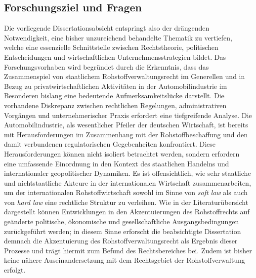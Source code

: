 \documentclass[12pt,a4paper,oneside]{book} %
\begin{document}
\subsection{Forschungsziel und Fragen}
Die vorliegende Dissertationsabsicht entspringt also der drängenden Notwendigkeit, eine bisher unzureichend behandelte Thematik zu vertiefen, welche eine essenzielle Schnittstelle zwischen Rechtstheorie, politischen Entscheidungen und wirtschaftlichen Unternehmensstrategien bildet. Das Forschungsvorhaben wird begründet durch die Erkenntnis, dass das Zusammenspiel von staatlichem Rohstoffverwaltungsrecht im Generellen und in Bezug zu privatwirtschaftlichen Aktivitäten in der Automobilindustrie im Besonderen bislang eine bedeutende Aufmerksamkeitslücke darstellt. Die vorhandene Diskrepanz zwischen rechtlichen Regelungen, administrativen Vorgängen und unternehmerischer Praxis erfordert eine tiefgreifende Analyse. Die Automobilindustrie, als wesentlicher Pfeiler der deutschen Wirtschaft, ist bereits mit Herausforderungen im Zusammenhang mit der Rohstoffbeschaffung und den damit verbundenen regulatorischen Gegebenheiten konfrontiert. Diese Herausforderungen können nicht isoliert betrachtet werden, sondern erfordern eine umfassende Einordnung in den Kontext des staatlichen Handelns und internationaler geopolitischer Dynamiken.
Es ist offensichtlich, wie sehr staatliche und nichtstaatliche Akteure in der internationalen Wirtschaft zusammenarbeiten, um der internationalen Rohstoffwirtschaft sowohl im Sinne von \textit{soft law} als auch von \textit{hard law} eine rechtliche Struktur zu verleihen. Wie in der Literaturübersicht dargestellt können Entwicklungen in den Akzentuierungen des Rohstoffrechts auf geänderte politische, ökonomische und gesellschaftliche Ausgangsbedingungen zurückgeführt werden; in diesem Sinne erforscht die beabsichtigte Dissertation demnach die Akzentuierung des Rohstoffverwaltungsrecht als Ergebnis dieser Prozesse und trägt hiermit zum Befund des Rechtsbereiches bei. Zudem ist bisher keine nähere Auseinandersetzung mit dem Rechtsgebiet der Rohstoffverwaltung erfolgt.
\end{document}
